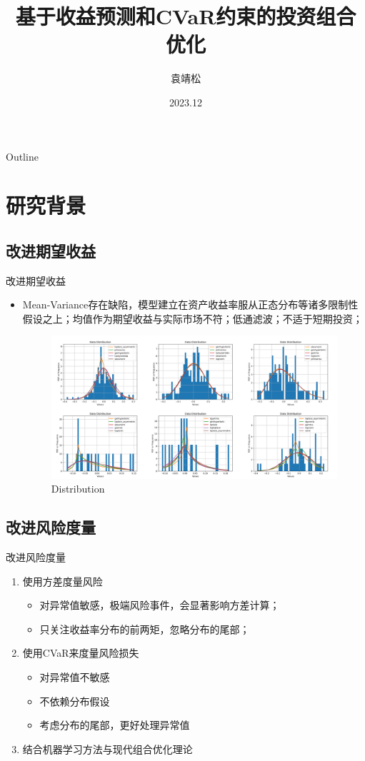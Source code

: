 \documentclass[CJK,aspectratio=43]{beamer}  %
\title[投资组合优化]{基于收益预测和CVaR约束的投资组合优化}
\author{袁靖松}
\institute{金融数学专题展示}
\date{2023.12}
\begin{document}
	\begin{frame}
		\titlepage
	\end{frame}
	\begin{frame}{Outline}
	\end{frame}
\section{研究背景}
\subsection{改进期望收益}
	\begin{frame}{改进期望收益}
			\begin{itemize}
				\item Mean-Variance存在缺陷，模型建立在资产收益率服从正态分布等诸多限制性假设之上；均值作为期望收益与实际市场不符；低通滤波；不适于短期投资；
			\begin{figure}
				\centering
				\includegraphics[width=1.04\linewidth]{"pic/distribution of random six"}
				\caption{Distribution}
				\label{fig:distribution-of-random-stock}
			\end{figure}
			\end{itemize}
	\end{frame}
\subsection{改进风险度量}
	\begin{frame}{改进风险度量}
		\begin{enumerate}
			\item 使用方差度量风险
			\begin{itemize}
				\item 对异常值敏感，极端风险事件，会显著影响方差计算；
				\item 只关注收益率分布的前两矩，忽略分布的尾部；
			\end{itemize}
			\item 使用CVaR来度量风险损失
			\begin{itemize}
				\item 对异常值不敏感
				\item 不依赖分布假设
				\item 考虑分布的尾部，更好处理异常值
			\end{itemize}
			\item 结合机器学习方法与现代组合优化理论
			\cite{Tong2021}
		\end{enumerate}
	\end{frame}
\end{document}

